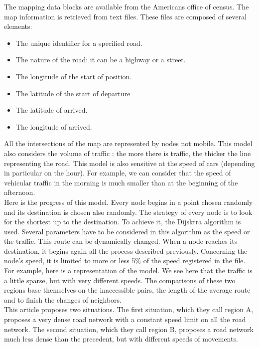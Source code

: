 The mapping data blocks are available from the Americans office of census. The map information is retrieved from text files. These files are composed of several elements:

\begin{itemize}
\item The unique identifier for a specified road.
\item The nature of the road: it can be a highway or a street.
\item The longitude of the start of position.
\item The latitude of the start of departure
\item The latitude of arrived.
\item The longitude of arrived.
\end{itemize}

All the intersections of the map are represented by nodes not mobile.
This model also considers the volume of traffic : the more there is traffic, the thicker the line representing the road.
This model is also sensitive at the speed of cars (depending in particular on the hour). For example, we can consider that the speed of vehicular traffic in the morning is much smaller than at the beginning of the afternoon.\\

Here is the progress of this model. Every node begins in a point chosen randomly and its destination is chosen also randomly. The strategy of every node is to look for the shortest up to the destination. To achieve it, the Dijsktra algorithm is used. Several parameters have to be considered in this algorithm as the speed or the traffic. This route can be dynamically changed. When a node reaches its destination, it begins again all the process described previously. Concerning the node's speed, it is limited to more or less 5\% of the speed registered in the file.\\
For example, here is a representation of the model. We see here that the traffic is a little sparse, but with very different speeds. The comparisons of these two regions base themselves on the inaccessible pairs, the length of the average route and to finish the changes of neighbors.\\

This article proposes two situations.
The first situation, which they call region A, proposes a very dense road network with a constant speed limit on all the road network. The second situation, which they call region B, proposes a road network much less dense than the precedent, but with different speeds of movements.

